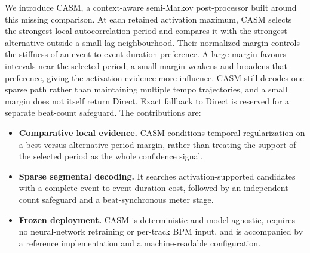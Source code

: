\documentclass{article}
\begin{document}
We introduce CASM, a context-aware semi-Markov post-processor built around this missing comparison. At each retained activation maximum, CASM selects the strongest local autocorrelation period and compares it with the strongest alternative outside a small lag neighbourhood. Their normalized margin controls the stiffness of an event-to-event duration preference. A large margin favours intervals near the selected period; a small margin weakens and broadens that preference, giving the activation evidence more influence. CASM still decodes one sparse path rather than maintaining multiple tempo trajectories, and a small margin does not itself return Direct. Exact fallback to Direct is reserved for a separate beat-count safeguard. The contributions are:
\begin{itemize}[leftmargin=*, nosep]
\item \textbf{Comparative local evidence.} CASM conditions temporal regularization on a best-versus-alternative period margin, rather than treating the support of the selected period as the whole confidence signal.
\item \textbf{Sparse segmental decoding.} It searches activation-supported candidates with a complete event-to-event duration cost, followed by an independent count safeguard and a beat-synchronous meter stage.
\item \textbf{Frozen deployment.} CASM is deterministic and model-agnostic, requires no neural-network retraining or per-track BPM input, and is accompanied by a reference implementation and a machine-readable configuration.
\end{itemize}



\end{document}
